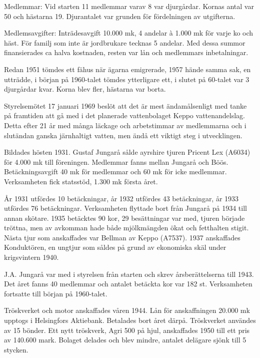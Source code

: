 Medlemmar: Vid starten 11 medlemmar varav 8 var djurgårdar. Kornas antal var 50 och hästarna 19. Djurantalet var grunden för fördelningen av utgifterna.

Medlemsavgifter: Inträdesavgift 10.000 mk, 4 andelar à 1.000 mk för varje ko och häst. För familj som inte är jordbrukare tecknas 5 andelar. Med dessa summor finansierades ca halva kostnaden, resten var lån och medlemmars inbetalningar.

Redan 1951 tömdes ett fähus när ägarna emigrerade, 1957 hände samma sak, en utträdde, i början på 1960-talet tömdes ytterligare ett, i slutet  på  60-talet var 3 djurgårdar kvar. Korna blev fler, hästarna var borta.

Styrelsemötet 17 januari 1969 beslöt att det är mest ändamålsenligt med tanke på framtiden att gå med i det planerade vattenbolaget Keppo vattenandelslag. Detta efter 21 år med många läckage och arbetstimmar av medlemmarna och i slutändan ganska järnhaltigt vatten, men ändå ett viktigt steg i utvecklingen.






Bildades hösten 1931. Gustaf Jungarå sålde ayrshire tjuren Pricent Lex (A6034) för 4.000 mk till 	föreningen. Medlemmar fanns mellan Jungarå och Böös. Betäckningsavgift 40 mk för medlemmar och 60 mk för icke	medlemmar. Verksamheten fick statsstöd, 1.300 mk första året.

År 1931 utfördes 10 betäckningar, år 1932 utfördes 43 betäckningar, år 1933 utfördes 76 betäckningar. 	Verksamheten flyttade bort från Jungarå på 1934 till annan skötare. 1935 betäcktes 90 kor, 29 besättningar var med, tjuren började tröttna, men av avkomman hade både mjölkmängden ökat och fetthalten stigit. Nästa tjur som anskaffades var Bellman av Keppo (A7537). 1937 anskaffades Konduktören,  en ungtjur som såldes på grund av ekonomiska skäl under krigsvintern 1940.

J.A. Jungarå var med i styrelsen från starten och skrev årsberättelserna till 1943. Det året fanns 40 medlemmar och antalet betäckta kor var 182 st. Verksamheten fortsatte till början 	på 1960-talet.





Tröskverket och motor anskaffades våren 1944. Lån för anskaffningen 20.000 mk upptogs i Helsingfors Aktiebank. Betalades bort året därpå. Tröskverket användes av 15 bönder. Ett nytt tröskverk, Agri 500 på hjul, anskaffades 1950 till ett pris av 140.600 mark. Bolaget delades och blev mindre, antalet delägare sjönk till 5 stycken.

